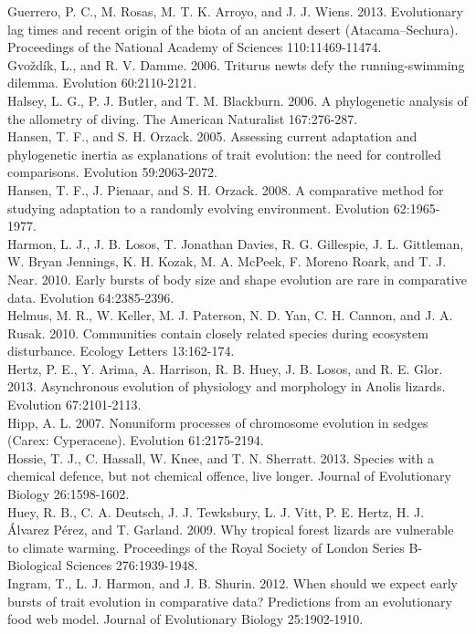 \documentclass[a4paper,12pt]{article}
\begin{document}
Guerrero, P. C., M. Rosas, M. T. K. Arroyo, and J. J. Wiens. 2013. Evolutionary lag times and recent origin of the biota of an ancient desert (Atacama–Sechura). Proceedings of the National Academy of Sciences 110:11469-11474.\\
Gvo\v{z}d\'{i}k, L., and R. V. Damme. 2006. Triturus newts defy the running-swimming dilemma. Evolution 60:2110-2121.\\
Halsey, L. G., P. J. Butler, and T. M. Blackburn. 2006. A phylogenetic analysis of the allometry of diving. The American Naturalist 167:276-287.\\
Hansen, T. F., and S. H. Orzack. 2005. Assessing current adaptation and phylogenetic inertia as explanations of trait evolution: the need for controlled comparisons. Evolution 59:2063-2072.\\
Hansen, T. F., J. Pienaar, and S. H. Orzack. 2008. A comparative method for studying adaptation to a randomly evolving environment. Evolution 62:1965-1977.\\
Harmon, L. J., J. B. Losos, T. Jonathan Davies, R. G. Gillespie, J. L. Gittleman, W. Bryan Jennings, K. H. Kozak, M. A. McPeek, F. Moreno Roark, and T. J. Near. 2010. Early bursts of body size and shape evolution are rare in comparative data. Evolution 64:2385-2396.\\
Helmus, M. R., W. Keller, M. J. Paterson, N. D. Yan, C. H. Cannon, and J. A. Rusak. 2010. Communities contain closely related species during ecosystem disturbance. Ecology Letters 13:162-174.\\
Hertz, P. E., Y. Arima, A. Harrison, R. B. Huey, J. B. Losos, and R. E. Glor. 2013. Asynchronous evolution of physiology and morphology in Anolis lizards. Evolution 67:2101-2113.\\
Hipp, A. L. 2007. Nonuniform processes of chromosome evolution in sedges (Carex: Cyperaceae). Evolution 61:2175-2194.\\
Hossie, T. J., C. Hassall, W. Knee, and T. N. Sherratt. 2013. Species with a chemical defence, but not chemical offence, live longer. Journal of Evolutionary Biology 26:1598-1602.\\
Huey, R. B., C. A. Deutsch, J. J. Tewksbury, L. J. Vitt, P. E. Hertz, H. J. \'{A}lvarez P\'{e}rez, and T. Garland. 2009. Why tropical forest lizards are vulnerable to climate warming. Proceedings of the Royal Society of London Series B-Biological Sciences 276:1939-1948.\\
Ingram, T., L. J. Harmon, and J. B. Shurin. 2012. When should we expect early bursts of trait evolution in comparative data? Predictions from an evolutionary food web model. Journal of Evolutionary Biology 25:1902-1910.\\
\end{document}
